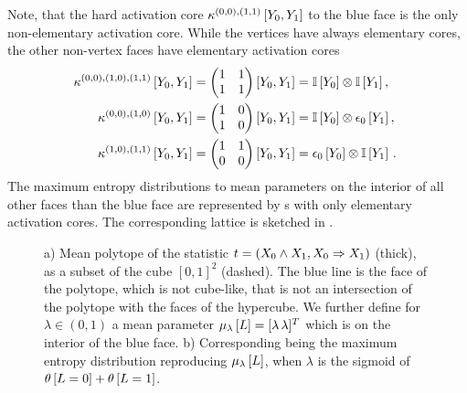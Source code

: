 \begin{example}
    Note, that the hard activation core $\kappa^{(0,0),(1,1)}\left[Y_{0},Y_{1}\right]$ to the blue face is the only non-elementary activation core.
    While the vertices have always elementary cores, the other non-vertex faces have elementary activation cores
    \begin{align*}
        \kappa^{(0,0),(1,0),(1,1)}\left[Y_{0},Y_{1}\right]
        &= \begin{pmatrix} 
            1 & 1 \\
            1 & 1
         \end{pmatrix}\left[Y_{0},Y_{1}\right]
        = \mathbb{I}\left[Y_{0}\right] \otimes \mathbb{I}\left[Y_{1}\right]
        , \quad\\
        \kappa^{(0,0),(1,0)}\left[Y_{0},Y_{1}\right]
        &= \begin{pmatrix} 
            1 & 0 \\
            1 & 0
         \end{pmatrix}\left[Y_{0},Y_{1}\right]
        = \mathbb{I}\left[Y_{0}\right] \otimes \epsilon_{0}\left[Y_{1}\right]
        ,\\
        \kappa^{(1,0),(1,1)}\left[Y_{0},Y_{1}\right]
        &= \begin{pmatrix} 
            1 & 1 \\
            0 & 0
         \end{pmatrix}\left[Y_{0},Y_{1}\right]
        = \epsilon_{0}\left[Y_{0}\right] \otimes \mathbb{I}\left[Y_{1}\right]   \, .
    \end{align*}
    The maximum entropy distributions to mean parameters on the interior of all other faces than the blue face are represented by \ComputationActivationNetwork{}s with only elementary activation cores.
    The corresponding lattice is sketched in .

    \begin{figure}
        \begin{center}
            
        \end{center}
        \caption{
            a) Mean polytope of the statistic $t=(X_{0} \land X_{1}, X_{0} \Rightarrow X_{1})$ (thick), as a subset of the cube $[0,1]^2$ (dashed).
            The blue line is the face of the polytope, which is not cube-like, that is not an intersection of the polytope with the faces of the hypercube.
            We further define for $\lambda\in(0,1)$ a mean parameter $\mu_{\lambda}\left[L\right] = [\lambda \,  \lambda]^T$ which is on the interior of the blue face.
            b) Corresponding \ComputationActivationNetwork{} being the maximum entropy distribution reproducing $\mu_{\lambda}\left[L\right]$, when $\lambda$ is the sigmoid of $\theta\left[L=0\right]+\theta\left[L=1\right]$.
        }\label{fig:nonelHlnstatMaxent}
    \end{figure}



\end{example}
